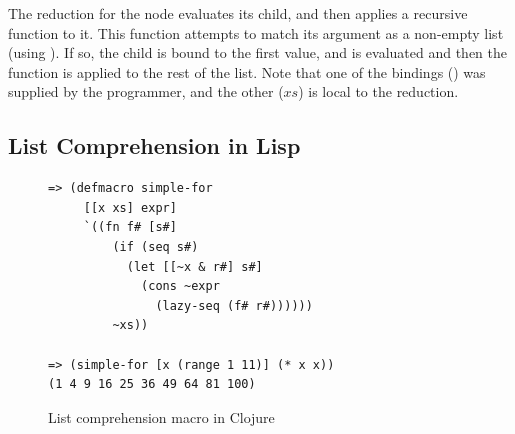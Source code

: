 The  reduction for the  node evaluates its  child, and then applies a recursive function to it. This function attempts to match its argument as a non-empty list (using ). If so, the  child is bound to the first value, and  is evaluated and then the function is applied to the rest of the list. Note that one of the bindings () was supplied by the programmer, and the other ($xs$) is local to the reduction. %


\subsection{List Comprehension in Lisp}

\begin{figure}[t]
\centering
\begin{verbatim}
=> (defmacro simple-for
     [[x xs] expr]
     `((fn f# [s#]
         (if (seq s#)
           (let [[~x & r#] s#]
             (cons ~expr
               (lazy-seq (f# r#))))))
         ~xs))

=> (simple-for [x (range 1 11)] (* x x))
(1 4 9 16 25 36 49 64 81 100)
\end{verbatim}

\caption{List comprehension macro in Clojure}
\label{fig-for-lisp}
\end{figure}

